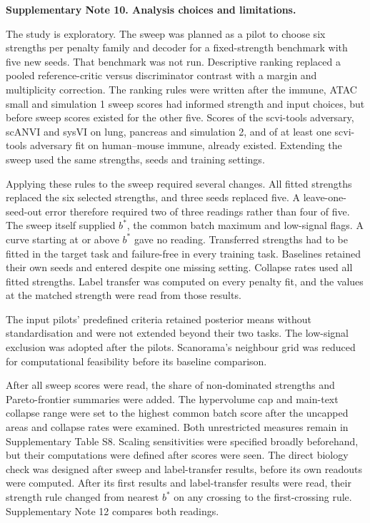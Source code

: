 \medskip\noindent\textbf{Supplementary Note 10. Analysis choices and limitations.}\par\smallskip
\begingroup\small\setlength{\parskip}{3pt}
The study is exploratory. The sweep was planned as a pilot to choose six strengths per penalty family and decoder for a fixed-strength benchmark with five new seeds. That benchmark was not run. Descriptive ranking replaced a pooled reference-critic versus discriminator contrast with a margin and multiplicity correction. The ranking rules were written after the immune, ATAC small and simulation 1 sweep scores had informed strength and input choices, but before sweep scores existed for the other five. Scores of the scvi-tools adversary, scANVI and sysVI on lung, pancreas and simulation 2, and of at least one scvi-tools adversary fit on human--mouse immune, already existed. Extending the sweep used the same strengths, seeds and training settings.

Applying these rules to the sweep required several changes. All fitted strengths replaced the six selected strengths, and three seeds replaced five. A leave-one-seed-out error therefore required two of three readings rather than four of five. The sweep itself supplied $b^*$, the common batch maximum and low-signal flags. A curve starting at or above $b^*$ gave no reading. Transferred strengths had to be fitted in the target task and failure-free in every training task. Baselines retained their own seeds and entered despite one missing setting. Collapse rates used all fitted strengths. Label transfer was computed on every penalty fit, and the values at the matched strength were read from those results.

The input pilots' predefined criteria retained posterior means without standardisation and were not extended beyond their two tasks. The low-signal exclusion was adopted after the pilots. Scanorama's neighbour grid was reduced for computational feasibility before its baseline comparison.

After all sweep scores were read, the share of non-dominated strengths and Pareto-frontier summaries were added. The hypervolume cap and main-text collapse range were set to the highest common batch score after the uncapped areas and collapse rates were examined. Both unrestricted measures remain in Supplementary Table S8. Scaling sensitivities were specified broadly beforehand, but their computations were defined after scores were seen. The direct biology check was designed after sweep and label-transfer results, before its own readouts were computed. After its first results and label-transfer results were read, their strength rule changed from nearest $b^*$ on any crossing to the first-crossing rule. Supplementary Note 12 compares both readings.

